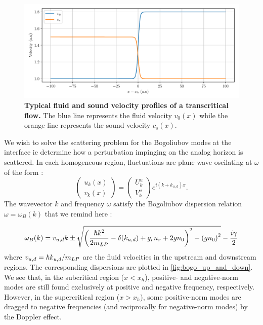 \begin{figure}[t!]
    \centering
    \includegraphics[width=1\textwidth]{chap_AG_theory/fig/typical_velocity.pdf}
    \caption{\textbf{Typical fluid and sound velocity profiles of a transcritical flow.} The blue line represents the fluid velocity $v_0(x)$ while the orange line represents the sound velocity $c_s(x)$.}
    \label{fig:velocity_and_density}
\end{figure}
\bigskip

We wish to solve the scattering problem for the Bogoliubov modes at the interface ie determine how a perturbation impinging on the analog horizon is scattered. In each homogeneous region, fluctuations are plane wave oscilating at $\omega$ of the form :
\begin{equation}
    \begin{pmatrix}
        u_k(x) \\
        v_k(x)
    \end{pmatrix} = \begin{pmatrix}
        U_k^u  \\
        V_k^u 
    \end{pmatrix}e^{i(k+k_{u,d})x}.
\end{equation}
The wavevector $k$ and frequency $\omega$ satisfy the Bogoliubov dispersion relation $\omega=\omega_B(k)$ that we remind here :

\begin{equation}
    \omega_B(k)=v_{u,d}k\pm\sqrt{\left(\dfrac{\hbar k^2}{2m_{LP}}-\delta(k_{u,d})+ g_rn_r +2g n_0\right)^2 - \left(g n_0\right)^2}-\dfrac{i\gamma}{2} 
    \label{eq:bogo_lab_frame_both_regions}
\end{equation}
where $v_{u,d}=\hbar k_{u,d}/m_{LP}$ are the fluid velocities in the upstream and downstream regions. The corresponding dispersions are plotted in \autoref{fig:bogo_up_and_down}. We see that, in the subcritical region ($x<x_h$), positive- and negative-norm modes are still found exclusively at positive and negative frequency, respectively.
However, in the supercritical region ($x>x_h$), some positive-norm modes are dragged to negative frequencies (and reciprocally for negative-norm modes) by the Doppler effect.

